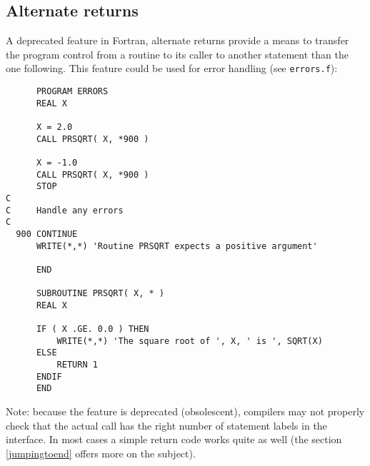 \subsection{Alternate returns}
A deprecated feature in Fortran, alternate returns provide a means to
transfer the program control from a routine to its caller to another
statement than the one following. This feature could be used for
error handling (see \verb+errors.f+):
\begin{verbatim}
      PROGRAM ERRORS
      REAL X

      X = 2.0
      CALL PRSQRT( X, *900 )

      X = -1.0
      CALL PRSQRT( X, *900 )
      STOP
C
C     Handle any errors
C
  900 CONTINUE
      WRITE(*,*) 'Routine PRSQRT expects a positive argument'

      END

      SUBROUTINE PRSQRT( X, * )
      REAL X

      IF ( X .GE. 0.0 ) THEN
          WRITE(*,*) 'The square root of ', X, ' is ', SQRT(X)
      ELSE
          RETURN 1
      ENDIF
      END
\end{verbatim}

Note: because the feature is deprecated (obsolescent), compilers may not properly check that
the actual call has the right number of statement labels in the interface. In most cases
a simple return code works quite as well (the section \ref{jumpingtoend} offers more
on the subject).

